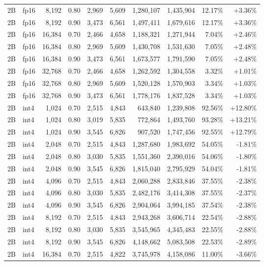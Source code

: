 \begin{longtable}{@{}llrrrrrrrr@{}}
2B & fp16 & 8,192 & 0.80 & 2,969 & 5,609 & 1,280,107 & 1,435,904 & 12.17\% & +3.36\% \\
2B & fp16 & 8,192 & 0.90 & 3,473 & 6,561 & 1,497,411 & 1,679,616 & 12.17\% & +3.36\% \\
2B & fp16 & 16,384 & 0.70 & 2,466 & 4,658 & 1,188,321 & 1,271,944 & 7.04\% & +2.46\% \\
2B & fp16 & 16,384 & 0.80 & 2,969 & 5,609 & 1,430,708 & 1,531,630 & 7.05\% & +2.48\% \\
2B & fp16 & 16,384 & 0.90 & 3,473 & 6,561 & 1,673,577 & 1,791,590 & 7.05\% & +2.48\% \\
2B & fp16 & 32,768 & 0.70 & 2,466 & 4,658 & 1,262,592 & 1,304,558 & 3.32\% & +1.01\% \\
2B & fp16 & 32,768 & 0.80 & 2,969 & 5,609 & 1,520,128 & 1,570,903 & 3.34\% & +1.03\% \\
2B & fp16 & 32,768 & 0.90 & 3,473 & 6,561 & 1,778,176 & 1,837,528 & 3.34\% & +1.03\% \\
2B & int4 & 1,024 & 0.70 & 2,515 & 4,843 & 643,840 & 1,239,808 & 92.56\% & +12.80\% \\
2B & int4 & 1,024 & 0.80 & 3,019 & 5,835 & 772,864 & 1,493,760 & 93.28\% & +13.21\% \\
2B & int4 & 1,024 & 0.90 & 3,545 & 6,826 & 907,520 & 1,747,456 & 92.55\% & +12.79\% \\
2B & int4 & 2,048 & 0.70 & 2,515 & 4,843 & 1,287,680 & 1,983,692 & 54.05\% & -1.81\% \\
2B & int4 & 2,048 & 0.80 & 3,030 & 5,835 & 1,551,360 & 2,390,016 & 54.06\% & -1.80\% \\
2B & int4 & 2,048 & 0.90 & 3,545 & 6,826 & 1,815,040 & 2,795,929 & 54.04\% & -1.81\% \\
2B & int4 & 4,096 & 0.70 & 2,515 & 4,843 & 2,060,288 & 2,833,846 & 37.55\% & -2.38\% \\
2B & int4 & 4,096 & 0.80 & 3,030 & 5,835 & 2,482,176 & 3,414,308 & 37.55\% & -2.37\% \\
2B & int4 & 4,096 & 0.90 & 3,545 & 6,826 & 2,904,064 & 3,994,185 & 37.54\% & -2.38\% \\
2B & int4 & 8,192 & 0.70 & 2,515 & 4,843 & 2,943,268 & 3,606,714 & 22.54\% & -2.88\% \\
2B & int4 & 8,192 & 0.80 & 3,030 & 5,835 & 3,545,965 & 4,345,483 & 22.55\% & -2.88\% \\
2B & int4 & 8,192 & 0.90 & 3,545 & 6,826 & 4,148,662 & 5,083,508 & 22.53\% & -2.89\% \\
2B & int4 & 16,384 & 0.70 & 2,515 & 4,822 & 3,745,978 & 4,158,086 & 11.00\% & -3.66\% \\

\end{longtable}
